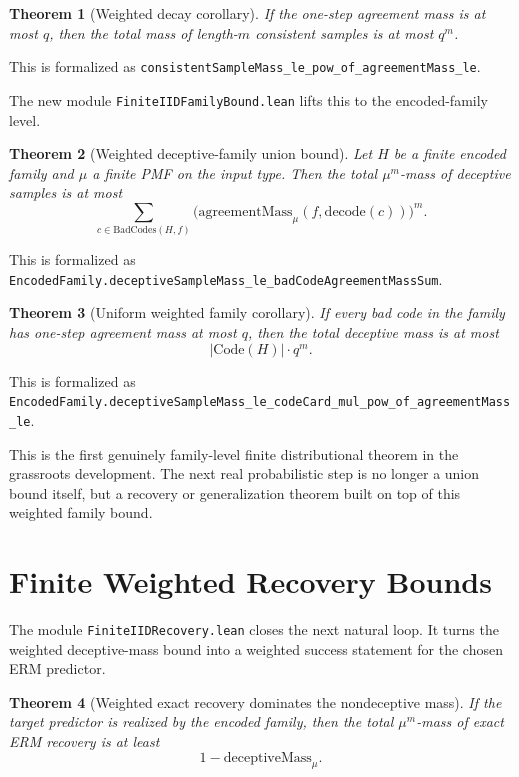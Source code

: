\documentclass[11pt]{article}
\newtheorem{theorem}{Theorem}[section]
\theoremstyle{remark}
\begin{document}
\begin{theorem}[Weighted decay corollary]
If the one-step agreement mass is at most \(q\), then the total mass of
length-\(m\) consistent samples is at most \(q^m\).
\end{theorem}

\noindent
This is formalized as
\texttt{consistentSampleMass\_le\_pow\_of\_agreementMass\_le}.

The new module \texttt{FiniteIIDFamilyBound.lean} lifts this to the encoded-family
level.

\begin{theorem}[Weighted deceptive-family union bound]
Let \(H\) be a finite encoded family and \(\mu\) a finite PMF on the input type.
Then the total \(\mu^m\)-mass of deceptive samples is at most
\[
  \sum_{c \in \mathrm{BadCodes}(H,f)}
    \bigl(\mathrm{agreementMass}_{\mu}(f,\mathrm{decode}(c))\bigr)^m.
\]
\end{theorem}

\noindent
This is formalized as
\texttt{EncodedFamily.deceptiveSampleMass\_le\_badCodeAgreementMassSum}.

\begin{theorem}[Uniform weighted family corollary]
If every bad code in the family has one-step agreement mass at most \(q\), then
the total deceptive mass is at most
\[
  |\mathrm{Code}(H)| \cdot q^m.
\]
\end{theorem}

\noindent
This is formalized as
\texttt{EncodedFamily.deceptiveSampleMass\_le\_codeCard\_mul\_pow\_of\_agreementMass\_le}.

This is the first genuinely family-level finite distributional theorem in the
grassroots development.  The next real probabilistic step is no longer a union
bound itself, but a recovery or generalization theorem built on top of this
weighted family bound.

\section{Finite Weighted Recovery Bounds}

The module \texttt{FiniteIIDRecovery.lean} closes the next natural loop.  It
turns the weighted deceptive-mass bound into a weighted success statement for the
chosen ERM predictor.

\begin{theorem}[Weighted exact recovery dominates the nondeceptive mass]
If the target predictor is realized by the encoded family, then the total
\(\mu^m\)-mass of exact ERM recovery is at least
\[
  1 - \mathrm{deceptiveMass}_{\mu}.
\]
\end{theorem}
\end{document}
